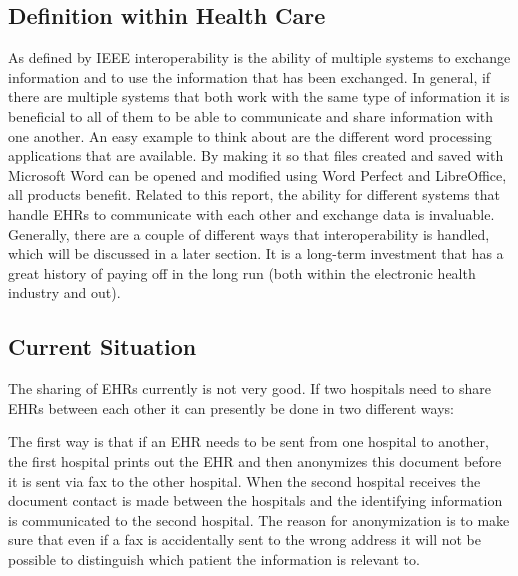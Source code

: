 \documentclass[14pt]{article}
\begin{document}
\subsection{Definition within Health Care} 
\label{sec:interopDefinition}



As defined by \gls{IEEE} interoperability is the ability of multiple systems to exchange information and to use the information that has been exchanged\cite{IEEE}.  In general, if there are multiple systems that both work with the same type of information it is beneficial to all of them to be able to communicate and share information with one another.  An easy example to think about are the different word processing applications that are available.  By making it so that files created and saved with Microsoft Word can be opened and modified using Word Perfect and LibreOffice, all products benefit.  Related to this report, the ability for different systems that handle \glspl{EHR} to communicate with each other and exchange data is invaluable.  Generally, there are a couple of different ways that interoperability is handled, which will be discussed in a later section.  It is a long-term investment that has a great history of paying off in the long run (both within the electronic health industry and out).

\subsection{Current Situation} %
\label{sec:interopCurrent}

The sharing of \glspl{EHR} currently is not very good. If two hospitals need to share \glspl{EHR} between each other it can presently be done in two different ways: \cite{EPJ2}

The first way is that if an \gls{EHR} needs to be sent from one hospital to another, the first hospital prints out the \gls{EHR} and then anonymizes this document before it is sent via fax to the other hospital. When the second hospital receives the document contact is made between the hospitals and the identifying information is communicated to the second hospital. \cite{EPJ2} The reason for anonymization is to make sure that even if a fax is accidentally sent to the wrong address it will not be possible to distinguish which patient the information is relevant to. \cite{EPJ2}
\end{document}
